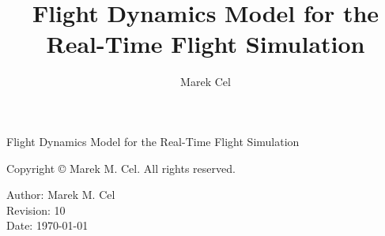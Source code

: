 \documentclass[12pt,a4paper]{report}
\title{Flight Dynamics Model for the Real-Time Flight Simulation}
\author{Marek Cel}
\date{}
\begin{document}
  
  \begin{titlepage}
    \centering
    {\huge Flight Dynamics Model for the Real-Time Flight Simulation\par}
  \end{titlepage}
  

  \noindent Copyright \copyright{} \the\year{} Marek M. Cel. All rights reserved.

  \noindent Author: Marek M. Cel \\
  Revision: 10 \\
  Date: \today

  
  
  {
    \clearpage
    \setlength{\parskip}{0em}
    \tableofcontents
  }

  
  
  
  
  
  
  \clearpage
   
  
  
\end{document}
